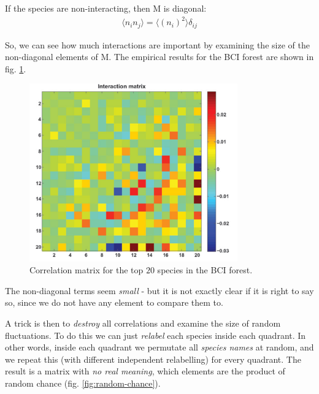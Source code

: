 \documentclass[../../main.tex]{subfiles}
\begin{document}
\medskip

If the species are non-interacting, then $\mathrm{M}$ is diagonal:
\begin{align*}
    \langle n_i n_j \rangle = \langle (n_i)^2 \rangle \delta_{ij}
\end{align*}

So, we can see how much interactions are important by examining the size of the non-diagonal elements of $\mathrm{M}$. The empirical results for the BCI forest are shown in fig. \ref{fig:bci-matrix}.

\begin{figure}[H]
    \centering
    \includegraphics[width=0.8\textwidth]{bci-matrix.png}
    \caption{Correlation matrix for the top $20$ species in the BCI forest.}
    \label{fig:bci-matrix}
\end{figure}

The non-diagonal terms seem \textit{small} - but it is not exactly clear if it is right to say so, since we do not have any element to compare them to.

A trick is then to \textit{destroy} all correlations and examine the size of random fluctuations. To do this we can just \textit{relabel} each species inside each quadrant. In other words, inside each quadrant we permutate all \textit{species names} at random, and we repeat this (with different independent relabelling) for every quadrant. The result is a matrix with \textit{no real meaning}, which elements are the product of random chance (fig. \ref{fig:random-chance}).
\end{document}
